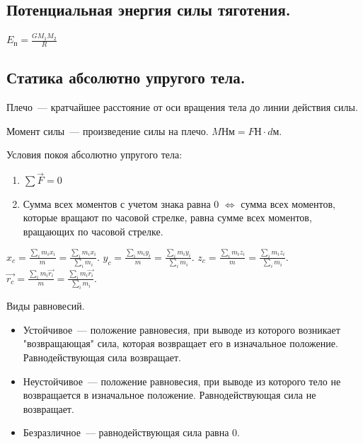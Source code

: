 \documentclass[12pt]{article}
\begin{document}
	\subsection{Потенциальная энергия силы тяготения.}
	$E_{\text{п}} = \frac{GM_1M_2}{R}$
	\subsection{Статика абсолютно упругого тела.}
	\begin{definition}
		Плечо~--- кратчайшее расстояние от оси вращения тела до линии действия силы.
	\end{definition}
	\begin{definition}
		Момент силы~--- произведение силы на плечо. $M \text{Нм} = F \text{Н} \cdot d \text{м}$.
	\end{definition}
	\begin{definition}
		Условия покоя абсолютно упругого тела:
		\begin{enumerate}
			\item $\sum \vec{F} = 0$
			\item Сумма всех моментов с учетом знака равна $0$ $\Leftrightarrow$ сумма всех моментов, которые вращают по часовой стрелке, равна сумме всех моментов, вращающих по часовой стрелке.
		\end{enumerate}
	\end{definition}
	\begin{definition}
		$x_c = \frac{\sum\limits_i m_i x_i}{m} = \frac{\sum\limits_i m_i x_i}{\sum\limits_i m_i}$. $y_c = \frac{\sum\limits_i m_i y_i}{m} = \frac{\sum\limits_i m_i y_i}{\sum\limits_i m_i}$. $z_c = \frac{\sum\limits_i m_i z_i}{m} = \frac{\sum\limits_i m_i z_i}{\sum\limits_i m_i}$. $\vec{r_c} = \frac{\sum\limits_i m_i \vec{r_i}}{m} = \frac{\sum\limits_i m_i \vec{r_i}}{\sum\limits_i m_i}$.
	\end{definition}
	\begin{definition}
		Виды равновесий.
		\begin{itemize}
			\item Устойчивое~--- положение равновесия, при выводе из которого возникает "возвращающая" сила, которая возвращает его в изначальное положение. Равнодействующая сила возвращает.
			\item Неустойчивое~--- положение равновесия, при выводе из которого тело не возвращается в изначальное положение. Равнодействующая сила не возвращает.
			\item Безразличное~--- равнодействующая сила равна $0$.
		\end{itemize}
	\end{definition}
\end{document}
